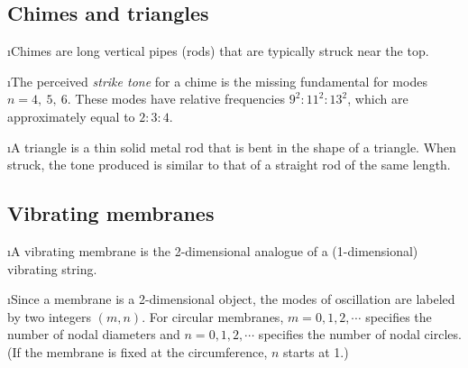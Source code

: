 \ei
\subsection{Chimes and triangles}
\bi

\i Chimes are long vertical pipes (rods) 
that are typically struck near the top.

\i The perceived {\em strike tone} for a 
chime is the missing
fundamental for modes $n=4,\ 5,\ 6$.
These modes have relative frequencies 
$9^2:11^2:13^2$, which are approximately 
equal to $2:3:4$.

\i A triangle is a thin solid metal rod that 
is bent in the shape of a triangle.  
When struck, the tone produced is similar to 
that of a straight rod of the same length.

\ei
\subsection{Vibrating membranes}
\bi

\i A vibrating membrane is the 2-dimensional
analogue of a (1-dimensional) vibrating string.

\i Since a membrane is a 2-dimensional object,
the modes of oscillation are labeled by two 
integers $(m,n)$.
For circular membranes,
$m=0,1,2,\cdots$ specifies the number of nodal diameters and 
$n=0,1,2,\cdots$ specifies the number of nodal 
circles.
(If the membrane is fixed at the circumference, 
$n$ starts at 1.)

